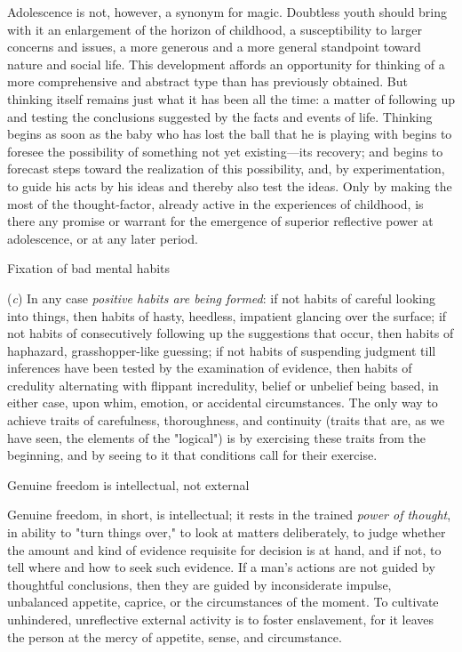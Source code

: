 \documentclass[letterpaper]{book}
\begin{document}
Adolescence is not, however, a synonym for magic. Doubtless youth should
bring with it an enlargement of the horizon of childhood, a
susceptibility to larger concerns and issues, a more generous and a more
general standpoint toward nature and social life. This development
affords an opportunity for thinking of a more
comprehensive
and abstract type than has previously obtained. But thinking itself
remains just what it has been all the time: a matter of following up and
testing the conclusions suggested by the facts and events of life.
Thinking begins as soon as the baby who has lost the ball that he is
playing with begins to foresee the possibility of something not yet
existing---its recovery; and begins to forecast steps toward the
realization of this possibility, and, by experimentation, to guide his
acts by his ideas and thereby also test the ideas. Only by making the
most of the thought-factor, already active in the experiences of
childhood, is there any promise or warrant for the emergence of superior
reflective power at adolescence, or at any later period.

Fixation of bad mental habits

(\emph{c}) In any case \emph{positive habits are being formed}: if not
habits of careful looking into things, then habits of hasty, heedless,
impatient glancing over the surface; if not habits of consecutively
following up the suggestions that occur, then habits of haphazard,
grasshopper-like guessing; if not habits of suspending judgment till
inferences have been tested by the examination of evidence, then habits
of credulity alternating with flippant incredulity, belief or unbelief
being based, in either case, upon whim, emotion, or accidental
circumstances. The only way to achieve traits of carefulness,
thoroughness, and continuity (traits that are, as we have seen, the
elements of the "logical") is by exercising these traits from the
beginning, and by seeing to it that conditions call for their exercise.

Genuine freedom is intellectual, not external

Genuine freedom, in short, is intellectual; it rests in the trained
\emph{power of thought}, in ability to "turn things over," to look at
matters deliberately, to judge whether the amount and kind of evidence
requisite for
decision
is at hand, and if not, to tell where and how to seek such evidence. If
a man's actions are not guided by thoughtful conclusions, then they are
guided by inconsiderate impulse, unbalanced appetite, caprice, or the
circumstances of the moment. To cultivate unhindered, unreflective
external activity is to foster enslavement, for it leaves the person at
the mercy of appetite, sense, and
circumstance.
\end{document}
